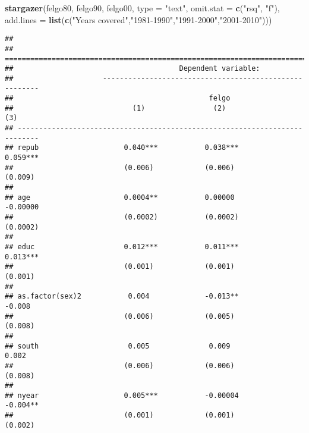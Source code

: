 \documentclass[]{article}
\newenvironment{Shaded}{\begin{snugshade}}{\end{snugshade}}
\newcommand{\DataTypeTok}[1]{\textcolor[rgb]{0.13,0.29,0.53}{#1}}
\newcommand{\KeywordTok}[1]{\textcolor[rgb]{0.13,0.29,0.53}{\textbf{#1}}}
\newcommand{\NormalTok}[1]{#1}
\newcommand{\StringTok}[1]{\textcolor[rgb]{0.31,0.60,0.02}{#1}}
\begin{document}
\begin{Shaded}
\begin{Highlighting}[]
\KeywordTok{stargazer}\NormalTok{(felgo80, felgo90, felgo00, }\DataTypeTok{type =} \StringTok{"text"}\NormalTok{, }\DataTypeTok{omit.stat =} \KeywordTok{c}\NormalTok{(}\StringTok{"rsq"}\NormalTok{, }\StringTok{"f"}\NormalTok{), }\DataTypeTok{add.lines =} \KeywordTok{list}\NormalTok{(}\KeywordTok{c}\NormalTok{(}\StringTok{"Years covered"}\NormalTok{,}\StringTok{"1981-1990"}\NormalTok{,}\StringTok{"1991-2000"}\NormalTok{,}\StringTok{"2001-2010"}\NormalTok{)))}
\end{Highlighting}
\end{Shaded}

\begin{verbatim}
## 
## ===========================================================================
##                                       Dependent variable:                  
##                     -------------------------------------------------------
##                                              felgo                         
##                            (1)                (2)                (3)       
## ---------------------------------------------------------------------------
## repub                    0.040***           0.038***          0.059***     
##                          (0.006)            (0.006)            (0.009)     
##                                                                            
## age                      0.0004**           0.00000           -0.00000     
##                          (0.0002)           (0.0002)          (0.0002)     
##                                                                            
## educ                     0.012***           0.011***          0.013***     
##                          (0.001)            (0.001)            (0.001)     
##                                                                            
## as.factor(sex)2           0.004             -0.013**           -0.008      
##                          (0.006)            (0.005)            (0.008)     
##                                                                            
## south                     0.005              0.009              0.002      
##                          (0.006)            (0.006)            (0.008)     
##                                                                            
## nyear                    0.005***           -0.00004          -0.004**     
##                          (0.001)            (0.001)            (0.002)     

\end{verbatim}
\end{document}
